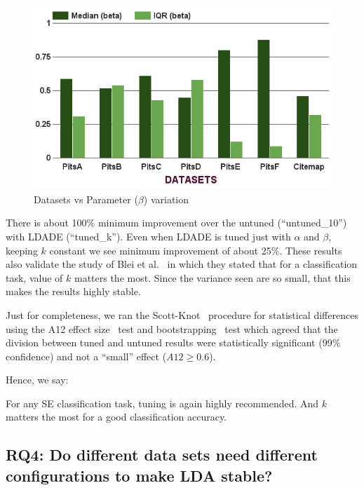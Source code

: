 \documentclass[twocolumn,5p,sort&compress]{elsarticle}
\theoremstyle{break}
\begin{document}
\begin{figure}[!t]
\begin{minipage}{.33\textwidth}
        \includegraphics[width=\linewidth]{./fig/Parameters_variation_b.png}
        \caption{Datasets vs Parameter ($\beta$) variation}
        \label{RQ3:b}
    \end{minipage}
\end{figure}

There is about 100\% minimum improvement over the untuned (``untuned\_10'')  with LDADE (``tuned\_k''). Even when LDADE is tuned just with $\alpha$ and $\beta$, keeping $k$ constant we see minimum improvement of about 25\%. These results also validate the study of Blei et al.~\cite{blei2003latent} in which they stated that for a classification task, value of $k$ matters the most. Since the variance seen are so small, that this makes the results highly stable.

Just for completeness, we ran the Scott-Knot~\cite{jelihovschi2014scottknott} procedure for statistical differences using the A12 effect size~\cite{vargha2000critique}
test and bootstrapping~\cite{efron1994introduction} test which agreed that the division between tuned and untuned results were statistically significant (99\% confidence) and not a ``small'' effect ($A12 \ge 0.6$).

\noindent
Hence, we say:

\begin{lesson}
For any SE classification task, tuning is again highly recommended. And $k$ matters the most for a good classification accuracy.
\end{lesson}

\subsection{\textbf{RQ4: Do different data sets
      need different configurations to make LDA stable?}}
      \label{sect:diff}
\end{document}
